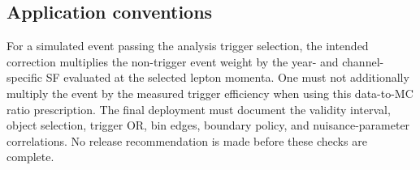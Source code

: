 \subsection{Application conventions}

For a simulated event passing the analysis trigger selection, the intended correction multiplies the non-trigger event weight by the year- and channel-specific SF evaluated at the selected lepton momenta. One must not additionally multiply the event by the measured trigger efficiency when using this data-to-MC ratio prescription. The final deployment must document the validity interval, object selection, trigger OR, bin edges, boundary policy, and nuisance-parameter correlations. No release recommendation is made before these checks are complete.
